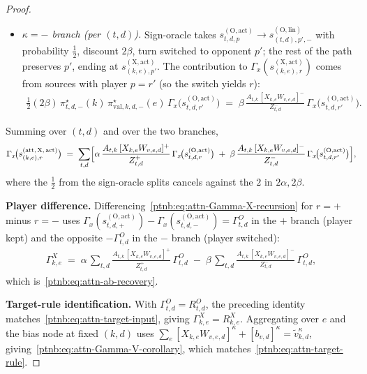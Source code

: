 \begin{proof}
\begin{itemize}
    \item \emph{$\kappa = -$ branch (per $(t,d)$).} Sign-oracle takes $s_{t,d,p}^{(\mathrm{O},\mathrm{act})}
            \to s_{(t,d),p',-}^{(\mathrm{O},\mathrm{lin})}$ with probability $\tfrac12$, discount $2\beta$,
        turn switched to opponent $p'$; the rest of the path preserves $p'$, ending at
        $s_{(k,e),p'}^{(\mathrm{X},\mathrm{act})}$. The contribution to
        $\Gamma_x(s_{(k,e),r}^{(\mathrm{X},\mathrm{act})})$ comes from sources with player $p = r'$ (so the
        switch yields $r$):
        \begin{align}
            \tfrac12 (2\beta)\, \pi_{t,d,-}^\star(k)\, \pi_{\mathrm{val},k,d,-}^\star(e)\,
            \Gamma_x\!\bigl(s_{t,d,r'}^{(\mathrm{O},\mathrm{act})}\bigr)
            \;=\; \beta\, \frac{A_{t,k}\, [X_{k,e} W_{v,e,d}]^-}{Z_{t,d}^-}\,
            \Gamma_x\!\bigl(s_{t,d,r'}^{(\mathrm{O},\mathrm{act})}\bigr).
        \end{align}
\end{itemize}
Summing over $(t,d)$ and over the two branches,
\begin{align}\label{ptnb:eq:attn-Gamma-X-recursion}
    \Gamma_x\!\bigl(s_{(k,e),r}^{(\mathrm{att},\,\mathrm{X},\,\mathrm{act})}\bigr)
    \;=\; \sum_{t,d} \Bigl[
    \alpha\, \frac{A_{t,k}\, [X_{k,e} W_{v,e,d}]^+}{Z_{t,d}^+}\,
    \Gamma_x\!\bigl(s_{t,d,r}^{(\mathrm{O},\mathrm{act})}\bigr)
    \;+\;
    \beta\, \frac{A_{t,k}\, [X_{k,e} W_{v,e,d}]^-}{Z_{t,d}^-}\,
    \Gamma_x\!\bigl(s_{t,d,r'}^{(\mathrm{O},\mathrm{act})}\bigr)
    \Bigr],
\end{align}
where the $\tfrac12$ from the sign-oracle splits cancels against the $2$ in $2\alpha, 2\beta$.

\textbf{Player difference.} Differencing~\eqref{ptnb:eq:attn-Gamma-X-recursion} for $r{=}+$ minus
$r{=}-$ uses $\Gamma_x(s_{t,d,+}^{(\mathrm{O},\mathrm{act})}) -
    \Gamma_x(s_{t,d,-}^{(\mathrm{O},\mathrm{act})}) = \Gamma^{O}_{t,d}$ in the $+$ branch (player kept)
and the opposite $-\Gamma^{O}_{t,d}$ in the $-$ branch (player switched):
\begin{align}
    \Gamma^{X}_{k,e}
    \;=\; \alpha\, \sum_{t,d} \frac{A_{t,k}\, [X_{k,e} W_{v,e,d}]^+}{Z_{t,d}^+}\, \Gamma^{O}_{t,d}
    \;-\; \beta\, \sum_{t,d} \frac{A_{t,k}\, [X_{k,e} W_{v,e,d}]^-}{Z_{t,d}^-}\, \Gamma^{O}_{t,d},
\end{align}
which is~\eqref{ptnb:eq:attn-ab-recovery}.

\textbf{Target-rule identification.} With $\Gamma^{O}_{t,d} = R^{O}_{t,d}$, the preceding identity
matches~\eqref{ptnb:eq:attn-target-input}, giving $\Gamma^{X}_{k,e} = R^{X}_{k,e}$. Aggregating
over $e$ and the bias node at fixed $(k,d)$ uses $\sum_e [X_{k,e} W_{v,e,d}]^\kappa +
    [b_{v,d}]^\kappa = \tilde{v}_{k,d}^\kappa$, giving~\eqref{ptnb:eq:attn-Gamma-V-corollary}, which
matches~\eqref{ptnb:eq:attn-target-rule}.
\end{proof}

